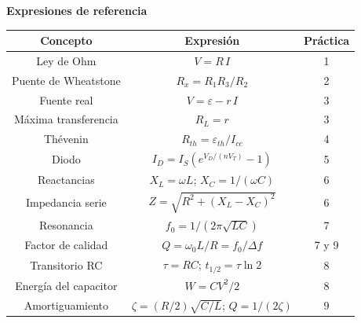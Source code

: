 \documentclass[11pt,a4paper]{article}
\begin{document}
\begin{center}
\begin{minipage}{\linewidth}
\centering
{\small
\textbf{Expresiones de referencia}\par\smallskip
\begin{tabular}{@{}ccc@{}}
\toprule
Concepto & Expresión & Práctica \\
\midrule
Ley de Ohm & $V = R\,I$ & 1 \\
Puente de Wheatstone & $R_x = R_1 R_3 / R_2$ & 2 \\
Fuente real & $V = \varepsilon - r\,I$ & 3 \\
Máxima transferencia & $R_L = r$ & 3 \\
Thévenin & $R_{th} = \varepsilon_{th}/I_{cc}$ & 4 \\
Diodo & $I_D = I_S\left(e^{V_D/(nV_T)} - 1\right)$ & 5 \\
Reactancias & $X_L = \omega L$; $X_C = 1/(\omega C)$ & 6 \\
Impedancia serie & $Z = \sqrt{R^2 + (X_L - X_C)^2}$ & 6 \\
Resonancia & $f_0 = 1/(2\pi\sqrt{LC})$ & 7 \\
Factor de calidad & $Q = \omega_0 L/R = f_0/\Delta f$ & 7 y 9 \\
Transitorio RC & $\tau = RC$; $t_{1/2} = \tau\ln 2$ & 8 \\
Energía del capacitor & $W = C V^2/2$ & 8 \\
Amortiguamiento & $\zeta = (R/2)\sqrt{C/L}$; $Q = 1/(2\zeta)$ & 9 \\
\bottomrule
\end{tabular}
}\par{}
\end{minipage}
\end{center}
\end{document}

